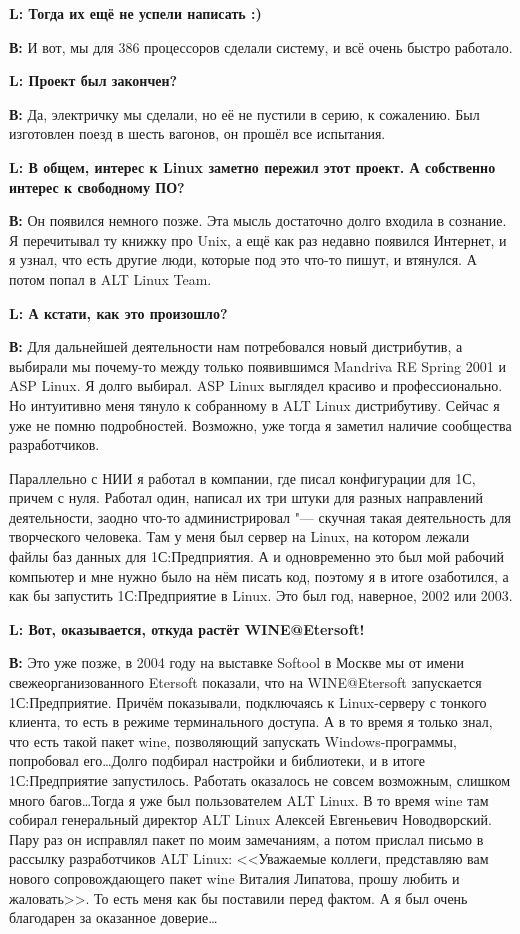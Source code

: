 \documentclass[10pt, a5paper]{article}
\begin{document}
{\noindent \bf L: Тогда их ещё не успели написать :)}

{\noindent \bf В:} И вот, мы для 386 процессоров сделали систему, и всё очень быстро работало.

{\noindent \bf L: Проект был закончен?}

{\noindent \bf В:} Да, электричку мы сделали, но её не пустили в серию, к сожалению. Был изготовлен поезд в шесть вагонов, он прошёл все испытания.

{\noindent \bf L: В общем, интерес к Linux заметно пережил этот проект. А собственно интерес к свободному ПО?}

{\noindent \bf В:} Он появился немного позже. Эта мысль достаточно долго входила в сознание. Я перечитывал ту книжку про Unix, а ещё как раз недавно появился Интернет, и я узнал, что есть другие люди, которые под это что-то пишут, и втянулся. А потом попал в ALT Linux Team.

{\noindent \bf L: А кстати, как это произошло?}

{\noindent \bf В:} Для дальнейшей деятельности нам потребовался новый дистрибутив, а выбирали мы почему-то между только появившимся Mandriva RE Spring 2001 и ASP Linux. Я долго выбирал. ASP Linux выглядел красиво и профессионально. Но интуитивно меня тянуло к собранному в ALT Linux дистрибутиву. Сейчас я уже не помню подробностей. Возможно, уже тогда я заметил наличие сообщества разработчиков.

Параллельно с НИИ я работал в компании, где  писал конфигурации для 1С, причем с нуля. Работал один, написал их три штуки для разных направлений деятельности, заодно что-то администрировал "--- скучная такая деятельность для творческого человека. Там у меня был сервер на Linux, на котором лежали файлы баз данных для 1С:Предприятия. А и одновременно это был мой рабочий компьютер и мне нужно было на нём писать код, поэтому я в итоге озаботился, а как бы запустить 1С:Предприятие в Linux. Это был год, наверное, 2002 или 2003.  

{\noindent \bf L: Вот, оказывается, откуда растёт WINE@Etersoft!}

{\noindent \bf В:} Это уже позже, в 2004 году на выставке Softool в Москве мы от имени свежеорганизованного Etersoft показали, что на  WINE@Eter\-soft запускается 1С:Предприятие. Причём показывали, подключаясь к Linux-серверу с тонкого клиента, то есть в режиме терминального доступа. А в то время я только знал, что есть такой пакет wine, позволяющий запускать Windows-программы, попробовал его\ldots Долго подбирал настройки и библиотеки, и в итоге 1С:Предприятие запустилось. Работать оказалось не совсем возможным, слишком много багов\ldots Тогда я уже был пользователем ALT Linux. В то время wine там собирал генеральный директор ALT Linux Алексей Евгеньевич Новодворский. Пару раз он исправлял пакет по моим замечаниям, а потом прислал письмо в рассылку разработчиков ALT Linux: <<Уважаемые коллеги, представляю вам нового сопровождающего пакет wine Виталия Липатова, прошу любить и жаловать>>. То есть меня как бы поставили перед фактом. А я был очень благодарен за оказанное доверие\ldots 
\end{document}
